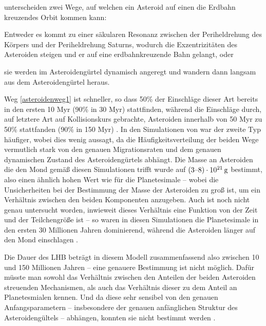 \documentclass[12pt,a4paper,twoside,open=right,bibliography=totoc]{scrbook}
\renewcommand{\cite}{ \citep}
\begin{document}
\cite{Gomes2005} unterscheiden zwei Wege, auf welchen ein Asteroid auf einen die Erdbahn kreuzendes Orbit kommen kann: 
\begin{inparaenum}
\item\label{asteroidenweg1} Entweder es kommt zu einer säkularen Resonanz zwischen der Periheldrehung des Körpers und der Periheldrehung Saturns, wodurch die Exzentrizitäten des Asteroiden steigen und er auf eine erdbahnkreuzende Bahn gelangt, oder
\item\label{asteroidenweg2} sie werden im Asteroidengürtel dynamisch angeregt und wandern dann langsam aus dem Asteroidengürtel heraus.
\end{inparaenum} %
Weg \ref{asteroidenweg1} ist schneller, so dass 50\% der Einschläge dieser Art bereits in den ersten 10 Myr (90\% in 30 Myr) stattfinden, während die Einschläge durch, auf letztere Art auf Kollisionskurs gebrachte, Asteroiden innerhalb von 50 Myr zu 50\% stattfanden (90\% in 150 Myr)\cite{Gomes2005}.
In den Simulationen von \cite{Gomes2005} war der zweite Typ häufiger, wobei dies wenig aussagt, da
die Häufigkeitsverteilung der beiden Wege vermutlich stark von den genauen Migrationsraten und dem genauen dynamischen Zustand des Asteroidengürtels abhängt.
Die Masse an Asteroiden die den Mond gemäß diesen Simulationen trifft wurde auf $\unit[\left( 3\text{--}8 \right) \cdot 10^{21}]{g}$ bestimmt,
also einen ähnlich hohen Wert wie für die Planetesimale – wobei die Unsicherheiten bei der Bestimmung der Masse der Asteroiden zu groß ist, um ein Verhältnis zwischen den beiden Komponenten anzugeben. Auch ist noch nicht genau untersucht worden, inwieweit dieses Verhältnis eine Funktion von der Zeit und der Teilchengröße ist – so waren in diesen Simulationen die Planetesimale in den ersten 30 Millionen Jahren dominierend, während die Asteroiden länger auf den Mond einschlagen\cite{Gomes2005}.

Die Dauer des LHB beträgt in diesem Modell zusammenfassend also zwischen 10 und 150 Millionen Jahren – eine genauere Bestimmung ist nicht möglich. Dafür müsste man sowohl das Verhältnis zwischen den Anteilen der beiden Asteroiden streuenden Mechanismen, als auch das Verhältnis dieser zu dem Anteil an Planetesmialen kennen. Und da diese sehr sensibel von den genauen Anfangsparametern – insbesondere der genauen anfänglichen Struktur des Asteroidengültels – abhängen, konnten sie nicht bestimmt werden\cite{Gomes2005}.
\end{document}
